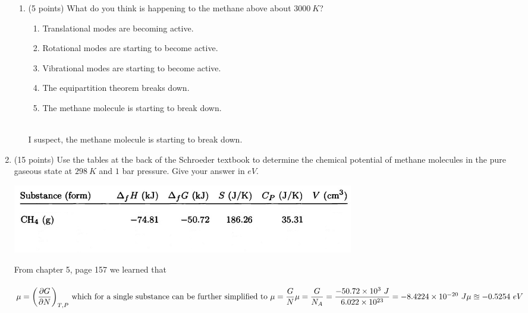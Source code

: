 \documentclass[fleqn]{article}
\begin{document}
\begin{enumerate}
\begin{enumerate}
      \item (5 points) What do you think is happening to the methane above about $3000 ~ K$?
      \begin{enumerate}
        \item Translational modes are becoming active.

        \item Rotational modes are starting to become active.

        \item Vibrational modes are starting to become active.

        \item The equipartition theorem breaks down.

        \item The methane molecule is starting to break down.

      \end{enumerate}

      \textcolor{hwColor}{
        \\
        I suspect, the methane molecule is starting to break down.
        \\
      }

    \end{enumerate}

    \pagebreak

    \item (15 points) Use the tables at the back of the Schroeder textbook to determine the chemical
    potential of methane molecules in the pure gaseous state at $298 ~ K$ and $1$ bar pressure. Give
    your answer in $eV$.
    \begin{center}
      \includegraphics[height=3cm, width=15cm]{question5.JPG}
    \end{center}

      \textcolor{hwColor}{
        From chapter 5, page 157 we learned that
        \\
        \\
        $
          \mu=\bigg( \dfrac{\partial G}{\partial N} \bigg)_{T, P}
          \text{ which for a single substance can be further simplified to }
          \mu=\dfrac{G}{N}
          \\
          \\
          \\
          \mu=\dfrac{G}{N_A}=\dfrac{-50.72 \times 10^3 ~ J}{6.022 \times 10^{23}}=-8.4224 \times 10^{-20} ~ J
          \\
          \\
          \\
          \mu \approxeq -0.5254 ~ eV
        $
      }


\end{enumerate}
\end{document}
